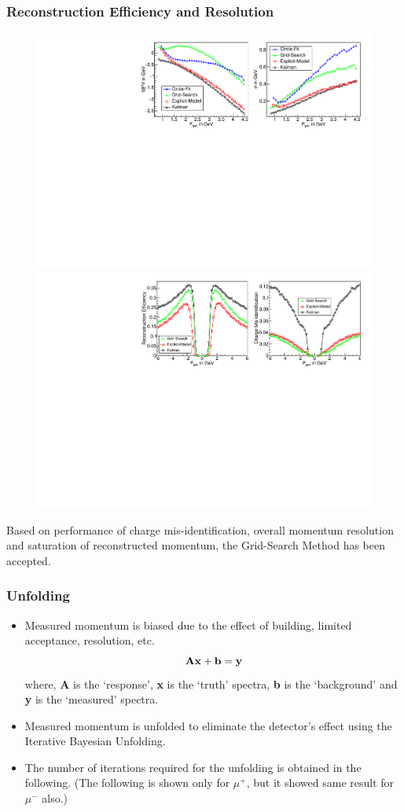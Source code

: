 \documentclass{beamer}
\begin{document}
\begin{frame}
  \frametitle{Reconstruction Efficiency and Resolution}
  \vspace*{-12pt}
  \begin{figure}[h!]
    \includegraphics[width=0.72\linewidth]{GMA_mpv_sigma_All4.pdf}\\
    \includegraphics[width=0.72\linewidth]{GMA_effi_misId_All4.pdf}
  \end{figure}
  \vspace*{-9pt}
  Based on performance of charge mis-identification, overall momentum
  resolution and saturation of reconstructed momentum, the
  Grid-Search Method has been accepted.
\end{frame}

\begin{frame}
  \frametitle{Unfolding}
  \vspace*{-9pt}
  \begin{itemize} %
  \item Measured momentum is biased due to the effect of building,
    limited acceptance, resolution, etc.
    \vspace*{-9pt}
    \[{\bf A}{\bf x}+{\bf b}={\bf y}\vspace*{-9pt}\]
    where, {\bf A} is the `response', {\bf x} is the `truth'
    spectra, {\bf b} is the `background' and {\bf y} is the `measured'
    spectra.
  \item Measured momentum is unfolded to eliminate the detector's
    effect using the Iterative Bayesian Unfolding.
  \item The number of iterations required for the unfolding is
    obtained in the following. (The following is shown only for $\mu^+$,
    but it showed same result for $\mu^-$ also.)
  \end{itemize}
\end{frame}
\end{document}
